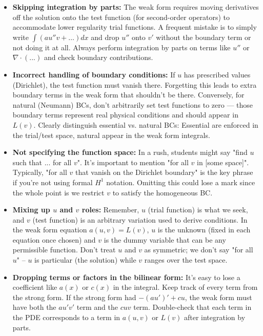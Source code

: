\documentclass[a4paper,11pt]{article}
\begin{document}
\begin{itemize}
    \item \textbf{Skipping integration by parts:} The weak form requires moving derivatives off the solution onto the test function (for second-order operators) to accommodate lower regularity trial functions. A frequent mistake is to simply write $\int (a u'' v + \dots)dx$ and drop $u''$ onto $v'$ without the boundary term or not doing it at all. Always perform integration by parts on terms like $u''$ or $\nabla \cdot (...)$ and check boundary contributions.

    \item \textbf{Incorrect handling of boundary conditions:} If $u$ has prescribed values (Dirichlet), the test function must vanish there. Forgetting this leads to extra boundary terms in the weak form that shouldn't be there. Conversely, for natural (Neumann) BCs, don't arbitrarily set test functions to zero — those boundary terms represent real physical conditions and should appear in $L(v)$. Clearly distinguish essential vs. natural BCs: Essential are enforced in the trial/test space, natural appear in the weak form integrals.

    \item \textbf{Not specifying the function space:} In a rush, students might say "find $u$ such that ... for all $v$". It's important to mention "for all $v$ in [some space]". Typically, "for all $v$ that vanish on the Dirichlet boundary" is the key phrase if you're not using formal $H^1$ notation. Omitting this could lose a mark since the whole point is we restrict $v$ to satisfy the homogeneous BC.

    \item \textbf{Mixing up $u$ and $v$ roles:} Remember, $u$ (trial function) is what we seek, and $v$ (test function) is an arbitrary variation used to derive conditions. In the weak form equation $a(u,v)=L(v)$, $u$ is the unknown (fixed in each equation once chosen) and $v$ is the dummy variable that can be any permissible function. Don't treat $u$ and $v$ as symmetric; we don't say "for all $u$" -- $u$ is particular (the solution) while $v$ ranges over the test space.

    \item \textbf{Dropping terms or factors in the bilinear form:} It's easy to lose a coefficient like $a(x)$ or $c(x)$ in the integral. Keep track of every term from the strong form. If the strong form had $- (a u')' + c u$, the weak form must have both the $a u' v'$ term and the $c u v$ term. Double-check that each term in the PDE corresponds to a term in $a(u,v)$ or $L(v)$ after integration by parts.


\end{itemize}
\end{document}
